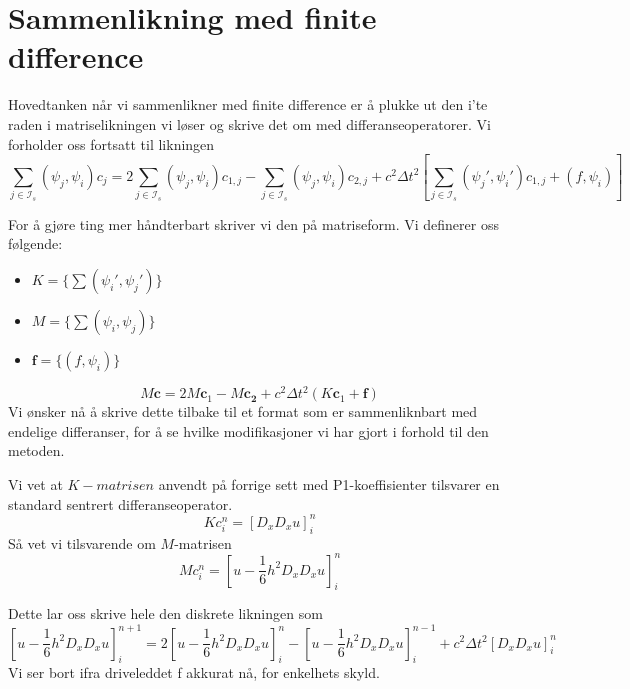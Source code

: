 \documentclass[a4paper, 10pt]{article}
\newcommand{\mb}{\mathbf}
\newcommand{\mc}{\mathcal}
\begin{document}
\section{Sammenlikning med finite difference}
Hovedtanken når vi sammenlikner med finite difference er å plukke ut den i'te raden i matriselikningen vi løser og skrive det om med differanseoperatorer. 
Vi forholder oss fortsatt til likningen
\begin{equation}
	\sum_{j \in \mc{I}_s } (\psi_j, \psi_i)c_j = 2\sum_{j \in \mc{I}_s }(\psi_j, \psi_i)c_{1, j} - \sum_{j \in \mc{I}_s }(\psi_j, \psi_i)c_{2, j} + c^2\Delta t^2 \left[\sum_{j \in \mc{I}_s } (\psi_j', \psi_i')c_{1, j} + (f, \psi_i)\right]
\end{equation}

For å gjøre ting mer håndterbart skriver vi den på matriseform.
Vi definerer oss følgende:
\begin{itemize}
\item $K = \{\sum (\psi_i', \psi_j')\}$
\item $M = \{\sum (\psi_i, \psi_j)\}$
\item $\mb{f} = \{(f, \psi_i)\}$
\end{itemize}

\begin{equation}
	M\mb{c} = 2M\mb{c}_1 - M\mb{c_2} + c^2\Delta t^2 (K\mb{c}_1 + \mb{f})
\end{equation}
Vi ønsker nå å skrive dette tilbake til et format som er sammenliknbart med endelige differanser, for å se hvilke modifikasjoner vi har gjort i forhold til den metoden.

Vi vet at $K-matrisen$ anvendt på forrige sett med P1-koeffisienter tilsvarer en standard sentrert differanseoperator.
\begin{equation}
Kc_i^n = [D_x D_x u]_i^n
\end{equation}
Så vet vi tilsvarende om $M$-matrisen
\begin{equation}
	Mc_i^n = [u-\frac{1}{6}h^2 D_x D_x u]_i^n
\end{equation}

Dette lar oss skrive hele den diskrete likningen som
\begin{equation}
	\left[u-\frac{1}{6} h^2 D_xD_x u\right]_i^{n+1} = 2\left[u-\frac{1}{6} h^2 D_xD_x u\right]_i^n - \left[u-\frac{1}{6} h^2 D_xD_x u\right]_i^{n-1} + c^2 \Delta t^2 \left[D_xD_xu\right]_i^n
\end{equation}
Vi ser bort ifra driveleddet f akkurat nå, for enkelhets skyld. 
\end{document}
